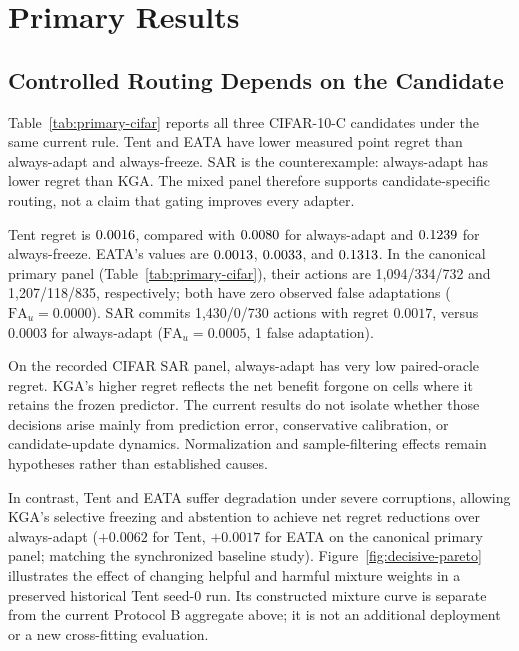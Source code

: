 \section{Primary Results}
\label{sec:compact-results}

\subsection{Controlled Routing Depends on the Candidate}

Table~\ref{tab:primary-cifar} reports all three CIFAR-10-C candidates under the same current rule.
Tent and EATA have lower measured point regret than always-adapt and always-freeze.
SAR is the counterexample: always-adapt has lower regret than KGA. The mixed panel therefore
supports candidate-specific routing, not a claim that gating improves every adapter.

\begin{table}[t]
\centering
\footnotesize
\caption{Primary controlled CIFAR-10-C results. Regret is the mean accuracy shortfall from the
per-cell oracle, on the proportion scale; lower is better. A/F/U denotes ADAPT/FREEZE/ABSTAIN.
Commitment rate is $(A+F)/n$, not interval coverage. Cells share checkpoints and residual pools.}
\label{tab:primary-cifar}
\resizebox{\textwidth}{!}{}
\end{table}

Tent regret is $0.0016$, compared with $0.0080$ for always-adapt and
$0.1239$ for always-freeze. EATA's values are $0.0013$,
$0.0033$, and $0.1313$. In the canonical primary panel (Table~\ref{tab:primary-cifar}), their actions are 1,094/334/732 and
1,207/118/835, respectively; both have zero observed false adaptations ($\mathrm{FA}_u = 0.0000$).
SAR commits 1,430/0/730 actions with regret $0.0017$, versus $0.0003$ for always-adapt ($\mathrm{FA}_u = 0.0005$, 1 false adaptation).

On the recorded CIFAR SAR panel, always-adapt has very low paired-oracle regret. KGA's higher regret
reflects the net benefit forgone on cells where it retains the frozen predictor. The current results
do not isolate whether those decisions arise mainly from prediction error, conservative calibration,
or candidate-update dynamics. Normalization and sample-filtering effects remain hypotheses rather than
established causes.

In contrast, Tent and EATA suffer degradation under severe corruptions, allowing KGA's selective
freezing and abstention to achieve net regret reductions over always-adapt ($+0.0062$ for Tent,
$+0.0017$ for EATA on the canonical primary panel; matching the synchronized baseline study).
Figure~\ref{fig:decisive-pareto} illustrates the effect of changing helpful and harmful mixture
weights in a preserved historical Tent seed-0 run. Its constructed mixture curve is separate
from the current Protocol B aggregate above; it is not an additional deployment or a new
cross-fitting evaluation.

